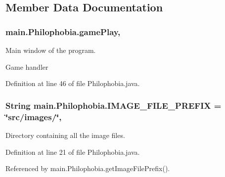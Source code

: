 \subsection{Member Data Documentation}
\hypertarget{a00017_a1abf384f2796e5ab254ff71c36ef939d}{
\subsubsection[{game\-Play}]{ main.\-Philophobia.\-game\-Play\hspace{0.3cm}{\ttfamily [static]}, {\ttfamily [protected]}}}\label{a00017_a1abf384f2796e5ab254ff71c36ef939d}


Main window of the program. 

Game handler 

Definition at line 46 of file Philophobia.\-java.

\hypertarget{a00017_a1e42124b5f083b3b4f1e6eb5ba774552}{
\subsubsection[{I\-M\-A\-G\-E\-\_\-\-F\-I\-L\-E\-\_\-\-P\-R\-E\-F\-I\-X}]{\setlength{\rightskip}{0pt plus 5cm}String main.\-Philophobia.\-I\-M\-A\-G\-E\-\_\-\-F\-I\-L\-E\-\_\-\-P\-R\-E\-F\-I\-X = \char`\"{}src/images/\char`\"{}\hspace{0.3cm}{\ttfamily [static]}, {\ttfamily [protected]}}}\label{a00017_a1e42124b5f083b3b4f1e6eb5ba774552}


Directory containing all the image files. 



Definition at line 21 of file Philophobia.\-java.



Referenced by main.\-Philophobia.\-get\-Image\-File\-Prefix().

